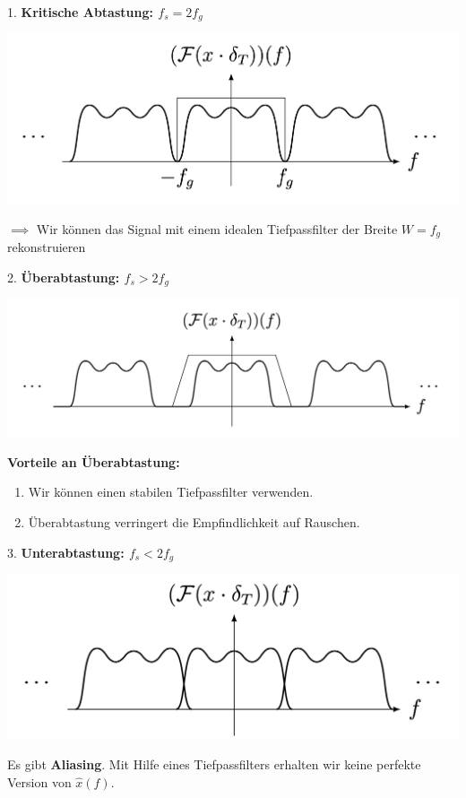 \documentclass[14pt, aspectratio=169, handout]{beamer}
\begin{document}
\begin{frame}{1. \textcolor{myblue}{\textbf{Kritische Abtastung: $f_s = 2 f_g$}}}
    \begin{center}
        \includegraphics[width=0.85\linewidth]{figures/krit_abtast.png}
    \end{center}
    $\implies$ Wir können das Signal mit einem idealen Tiefpassfilter der Breite $W = f_g$ rekonstruieren

\end{frame}

\begin{frame}{2. \textcolor{myblue}{\textbf{Überabtastung: $f_s > 2f_g$}}}
    \begin{center}
        \includegraphics[width=0.85\linewidth]{figures/ueberabtast.png}
    \end{center}

\textbf{Vorteile an Überabtastung:}
\begin{enumerate}
    \item Wir können einen stabilen Tiefpassfilter verwenden.
    \item Überabtastung verringert die Empfindlichkeit auf Rauschen.
\end{enumerate}
\end{frame}

\begin{frame}{3. \textcolor{myblue}{\textbf{Unterabtastung: $f_s < 2 f_g$}}}
    \begin{center}
        \includegraphics[width=0.8\linewidth]{figures/aliasing1.png}
    \end{center}
    Es gibt \textbf{Aliasing}. Mit Hilfe eines Tiefpassfilters erhalten wir keine perfekte Version von $\hat{x}(f)$.
\end{frame}
\end{document}
